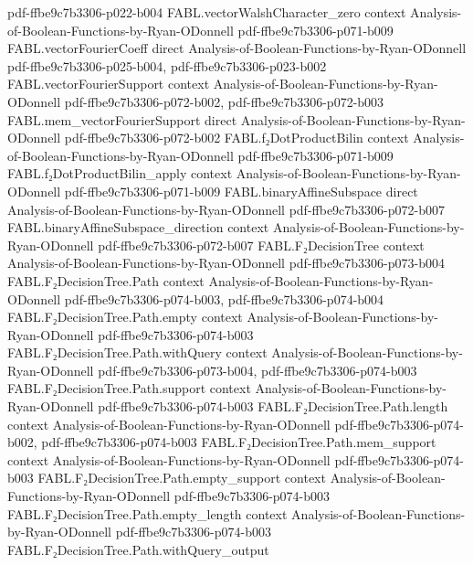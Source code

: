 \begin{theorem}
  {pdf-ffbe9c7b3306-p022-b004}
\proofstep
  {FABL.vectorWalshCharacter_zero}
  {context}
  {Analysis-of-Boolean-Functions-by-Ryan-ODonnell}
  {pdf-ffbe9c7b3306-p071-b009}
\proofstep
  {FABL.vectorFourierCoeff}
  {direct}
  {Analysis-of-Boolean-Functions-by-Ryan-ODonnell}
  {pdf-ffbe9c7b3306-p025-b004,
    pdf-ffbe9c7b3306-p023-b002}
\proofstep
  {FABL.vectorFourierSupport}
  {context}
  {Analysis-of-Boolean-Functions-by-Ryan-ODonnell}
  {pdf-ffbe9c7b3306-p072-b002,
    pdf-ffbe9c7b3306-p072-b003}
\proofstep
  {FABL.mem_vectorFourierSupport}
  {direct}
  {Analysis-of-Boolean-Functions-by-Ryan-ODonnell}
  {pdf-ffbe9c7b3306-p072-b002}
\proofstep
  {FABL.f₂DotProductBilin}
  {context}
  {Analysis-of-Boolean-Functions-by-Ryan-ODonnell}
  {pdf-ffbe9c7b3306-p071-b009}
\proofstep
  {FABL.f₂DotProductBilin_apply}
  {context}
  {Analysis-of-Boolean-Functions-by-Ryan-ODonnell}
  {pdf-ffbe9c7b3306-p071-b009}
\proofstep
  {FABL.binaryAffineSubspace}
  {direct}
  {Analysis-of-Boolean-Functions-by-Ryan-ODonnell}
  {pdf-ffbe9c7b3306-p072-b007}
\proofstep
  {FABL.binaryAffineSubspace_direction}
  {context}
  {Analysis-of-Boolean-Functions-by-Ryan-ODonnell}
  {pdf-ffbe9c7b3306-p072-b007}
\proofstep
  {FABL.F₂DecisionTree}
  {context}
  {Analysis-of-Boolean-Functions-by-Ryan-ODonnell}
  {pdf-ffbe9c7b3306-p073-b004}
\proofstep
  {FABL.F₂DecisionTree.Path}
  {context}
  {Analysis-of-Boolean-Functions-by-Ryan-ODonnell}
  {pdf-ffbe9c7b3306-p074-b003,
    pdf-ffbe9c7b3306-p074-b004}
\proofstep
  {FABL.F₂DecisionTree.Path.empty}
  {context}
  {Analysis-of-Boolean-Functions-by-Ryan-ODonnell}
  {pdf-ffbe9c7b3306-p074-b003}
\proofstep
  {FABL.F₂DecisionTree.Path.withQuery}
  {context}
  {Analysis-of-Boolean-Functions-by-Ryan-ODonnell}
  {pdf-ffbe9c7b3306-p073-b004,
    pdf-ffbe9c7b3306-p074-b003}
\proofstep
  {FABL.F₂DecisionTree.Path.support}
  {context}
  {Analysis-of-Boolean-Functions-by-Ryan-ODonnell}
  {pdf-ffbe9c7b3306-p074-b003}
\proofstep
  {FABL.F₂DecisionTree.Path.length}
  {context}
  {Analysis-of-Boolean-Functions-by-Ryan-ODonnell}
  {pdf-ffbe9c7b3306-p074-b002,
    pdf-ffbe9c7b3306-p074-b003}
\proofstep
  {FABL.F₂DecisionTree.Path.mem_support}
  {context}
  {Analysis-of-Boolean-Functions-by-Ryan-ODonnell}
  {pdf-ffbe9c7b3306-p074-b003}
\proofstep
  {FABL.F₂DecisionTree.Path.empty_support}
  {context}
  {Analysis-of-Boolean-Functions-by-Ryan-ODonnell}
  {pdf-ffbe9c7b3306-p074-b003}
\proofstep
  {FABL.F₂DecisionTree.Path.empty_length}
  {context}
  {Analysis-of-Boolean-Functions-by-Ryan-ODonnell}
  {pdf-ffbe9c7b3306-p074-b003}
\proofstep
  {FABL.F₂DecisionTree.Path.withQuery_output}

\end{theorem}
